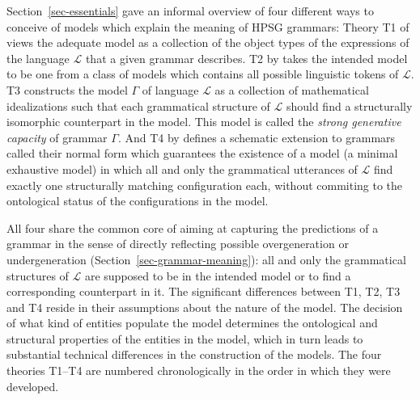 \documentclass[output=paper
                ,modfonts
                ,nonflat
	        ,collection
	        ,collectionchapter
	        ,collectiontoclongg
 	        ,biblatex
                ,babelshorthands
                ,newtxmath
                ,draftmode
                ,colorlinks, citecolor=brown
]{./langsci/langscibook}
\begin{document}
{{Section~\ref{sec-essentials} gave an informal overview of four
different ways to conceive of models which explain the meaning of HPSG
grammars: Theory T1 of \cite{PollardSag1994} views the adequate model
as a collection of the object types of the expressions of the language
$\mathcal{L}$ that a given grammar describes. T2 by \citet{King99a-u}
takes the intended model to be one from a class of models which contains
all possible linguistic tokens of $\mathcal{L}$.  T3
\citep{Pollard99a} constructs the model $\Gamma$ of language $\mathcal{L}$ as a
collection of mathematical idealizations such that each grammatical
structure of $\mathcal{L}$ should find a structurally isomorphic
counterpart in the model. This model is called the \emph{strong generative
capacity} of grammar $\Gamma$. And T4 by \citet{Richter2007a} defines a
schematic extension to grammars called their normal form which
guarantees the existence of a model (a minimal exhaustive model) in
which all and only the grammatical utterances of $\mathcal{L}$ find
exactly one structurally matching configuration each, without
commiting to the ontological status of the configurations in the
model.

All four share the common core of aiming at capturing the predictions
of a grammar in the sense of directly reflecting possible
overgeneration or undergeneration (Section~\ref{sec-grammar-meaning}):
all and only the grammatical structures of $\mathcal{L}$ are supposed
to be in the intended model or to find a corresponding counterpart in
it. The significant differences between T1, T2, T3 and T4 reside in
their assumptions about the nature of the model. The decision of what
kind of entities populate the model determines the ontological and
structural properties of the entities in the model, which in turn leads
to substantial technical differences in the construction of the
models.
The four theories T1--T4 are numbered chronologically in the order in
which they were developed.


}}
\end{document}
